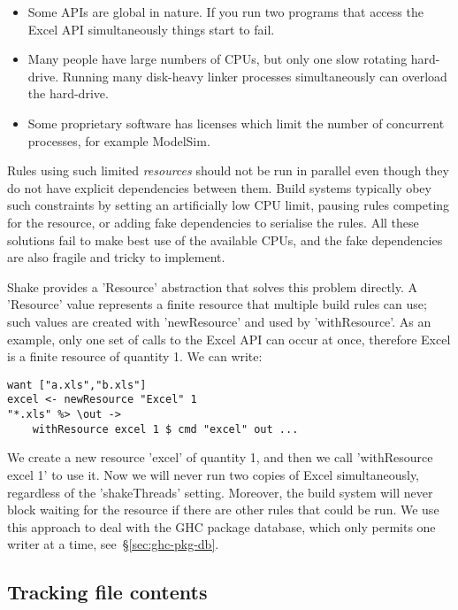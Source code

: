 \begin{itemize}
\item Some APIs are global in nature. If you run two programs that access the
Excel API simultaneously things start to fail.
\item Many people have large numbers of CPUs, but only one slow rotating
hard-drive. Running many disk-heavy linker processes simultaneously can overload
the hard-drive.
\item Some proprietary software has licenses which limit the number of
concurrent processes, for example ModelSim.
\end{itemize}

Rules using such limited \emph{resources} should not be run in
parallel even though they do not have explicit dependencies between them. Build systems
typically obey such constraints by setting an artificially low CPU limit, pausing rules
competing for the resource, or adding fake dependencies to serialise the rules.
All these solutions fail to make best use of the available CPUs, and the fake
dependencies are also fragile and tricky to implement.

Shake provides a \lst'Resource' abstraction that solves this problem directly.
A \lst'Resource' value represents a finite resource that multiple build rules can use;
such values are created with \lst'newResource' and used by \lst'withResource'. As an
example, only one set of calls to the Excel API can occur at once, therefore
Excel is a finite resource of quantity 1. We can write:

\begin{lstlisting}
want ["a.xls","b.xls"]
excel <- newResource "Excel" 1
"*.xls" %> \out ->
    withResource excel 1 $ cmd "excel" out ...
\end{lstlisting}

\noindent We create a new resource \lst'excel' of quantity 1, and then we call
\lst'withResource excel 1' to use it. Now we will never run two copies of
Excel simultaneously, regardless of the \lst'shakeThreads' setting.
Moreover, the build system will never block waiting for the resource if there
are other rules that could be run. We use this approach to deal with the GHC
package database, which only permits one writer at a time,
see~\S\ref{sec:ghc-pkg-db}.

\subsection{Tracking file contents\label{sec:file-contents}}

